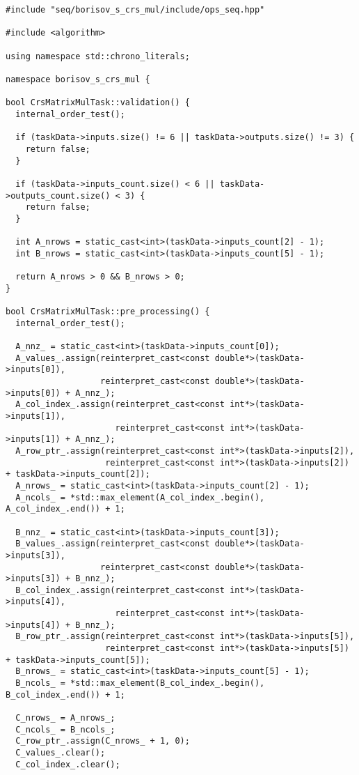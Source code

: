 \documentclass[12pt]{article}
\begin{document}
\begin{lstlisting}
#include "seq/borisov_s_crs_mul/include/ops_seq.hpp"

#include <algorithm>

using namespace std::chrono_literals;

namespace borisov_s_crs_mul {

bool CrsMatrixMulTask::validation() {
  internal_order_test();

  if (taskData->inputs.size() != 6 || taskData->outputs.size() != 3) {
    return false;
  }

  if (taskData->inputs_count.size() < 6 || taskData->outputs_count.size() < 3) {
    return false;
  }

  int A_nrows = static_cast<int>(taskData->inputs_count[2] - 1);
  int B_nrows = static_cast<int>(taskData->inputs_count[5] - 1);

  return A_nrows > 0 && B_nrows > 0;
}

bool CrsMatrixMulTask::pre_processing() {
  internal_order_test();

  A_nnz_ = static_cast<int>(taskData->inputs_count[0]);
  A_values_.assign(reinterpret_cast<const double*>(taskData->inputs[0]),
                   reinterpret_cast<const double*>(taskData->inputs[0]) + A_nnz_);
  A_col_index_.assign(reinterpret_cast<const int*>(taskData->inputs[1]),
                      reinterpret_cast<const int*>(taskData->inputs[1]) + A_nnz_);
  A_row_ptr_.assign(reinterpret_cast<const int*>(taskData->inputs[2]),
                    reinterpret_cast<const int*>(taskData->inputs[2]) + taskData->inputs_count[2]);
  A_nrows_ = static_cast<int>(taskData->inputs_count[2] - 1);
  A_ncols_ = *std::max_element(A_col_index_.begin(), A_col_index_.end()) + 1;

  B_nnz_ = static_cast<int>(taskData->inputs_count[3]);
  B_values_.assign(reinterpret_cast<const double*>(taskData->inputs[3]),
                   reinterpret_cast<const double*>(taskData->inputs[3]) + B_nnz_);
  B_col_index_.assign(reinterpret_cast<const int*>(taskData->inputs[4]),
                      reinterpret_cast<const int*>(taskData->inputs[4]) + B_nnz_);
  B_row_ptr_.assign(reinterpret_cast<const int*>(taskData->inputs[5]),
                    reinterpret_cast<const int*>(taskData->inputs[5]) + taskData->inputs_count[5]);
  B_nrows_ = static_cast<int>(taskData->inputs_count[5] - 1);
  B_ncols_ = *std::max_element(B_col_index_.begin(), B_col_index_.end()) + 1;

  C_nrows_ = A_nrows_;
  C_ncols_ = B_ncols_;
  C_row_ptr_.assign(C_nrows_ + 1, 0);
  C_values_.clear();
  C_col_index_.clear();


\end{lstlisting}
\end{document}
